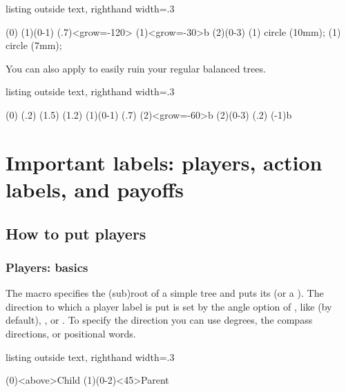 \begin{tcblisting}{listing outside text, righthand width=.3\linewidth}
\begin{istgame}
\xtdistance{10mm}{15mm}
\istroot(0) \istb \istb \istb    \endist
\istroot(1)(0-1) 
  \istbA(.7)<grow=-120>  %
  \istb                  %
  \istbA(1)<grow=-30>{b} %
  \endist
\istroot(2)(0-3) \istb {} \endist
\draw [dashed] (1) circle (10mm);
\draw [dotted] (1) circle (7mm);
\end{istgame}
\end{tcblisting}

You can also apply \cmd{\istbA} to easily ruin your regular balanced trees.

\begin{tcblisting}{listing outside text, righthand width=.3\linewidth}
\begin{istgame}
\xtdistance{10mm}{15mm}
\istroot(0) \istbA(.2) \istbA(1.5) \istbA(1.2) \endist
\istroot(1)(0-1) 
  \istbA(.7) \istb \istbA(2)<grow=-60>{b} \endist
\istroot(2)(0-3) \istbA(.2) \istbA(-1){b} \endist
\end{istgame}
\end{tcblisting}


\section{Important labels: players, action labels, and payoffs}
\label{sec:corelabels}

\subsection{How to put players}

\subsubsection{Players: basics}

The macro \icmd{\istroot} specifies the (sub)root of a simple tree and puts its  (or a ).
The direction to which a player label is put is set by the angle \xw{< >} option of \cmd{\istroot}, like  (by default), , or .
To specify the direction you can use degrees, the compass directions, or positional words.

\begin{tcblisting}{listing outside text, righthand width=.3\linewidth}
\begin{istgame}
\istroot(0)<above>{Child} %
  \istb  \istb  \endist
\istroot(1)(0-2)<45>{Parent}
  \istb  \istb  \endist
\end{istgame}
\end{tcblisting}

